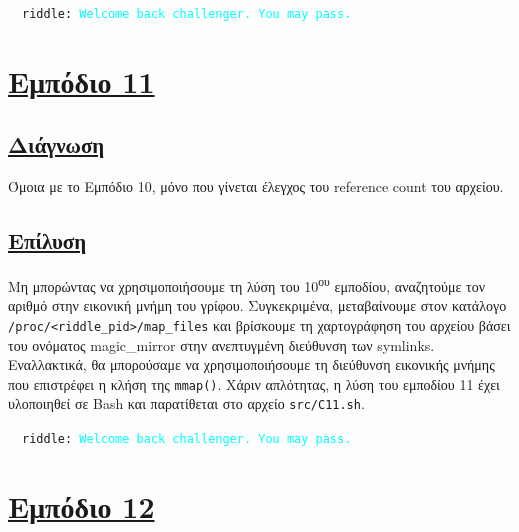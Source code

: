 \documentclass[12pt]{article}
\newcommand{\eng}[1]{\foreignlanguage{english}{#1}}
\begin{document}
\vspace{5mm}
\noindent\textcolor{gray!40}{\hrulefill}~~\texttt{\small \eng{riddle: \textcolor{cyan}{Welcome back challenger. You may pass.}}}~~\textcolor{gray!40}{\hrulefill}
\vspace{5mm}

\section*{\ul{Εμπόδιο 11}}
\subsection*{\ul{Διάγνωση}}
Όμοια με το Εμπόδιο 10, μόνο που γίνεται έλεγχος του \eng{reference count} του αρχείου.
\subsection*{\ul{Επίλυση}}
Μη μπορώντας να χρησιμοποιήσουμε τη λύση του 10\textsuperscript{ου} εμποδίου, αναζητούμε τον αριθμό στην εικονική μνήμη του γρίφου.
Συγκεκριμένα, μεταβαίνουμε στον κατάλογο \eng{\texttt{/proc/<riddle\_pid>/map\_files}} και βρίσκουμε τη χαρτογράφηση του αρχείου βάσει του ονόματος \eng{magic\_mirror} στην ανεπτυγμένη διεύθυνση των \eng{symlinks}. Εναλλακτικά, θα μπορούσαμε να χρησιμοποιήσουμε τη διεύθυνση εικονικής μνήμης που επιστρέφει η κλήση της \eng{\texttt{mmap()}}.
Χάριν απλότητας, η λύση του εμποδίου 11 έχει υλοποιηθεί σε \eng{Bash} και παρατίθεται στο αρχείο \eng{\texttt{src/C11.sh}}.

\vspace{5mm}
\noindent\textcolor{gray!40}{\hrulefill}~~\texttt{\small \eng{riddle: \textcolor{cyan}{Welcome back challenger. You may pass.}}}~~\textcolor{gray!40}{\hrulefill}
\vspace{5mm}

\section*{\ul{Εμπόδιο 12}}
\end{document}
